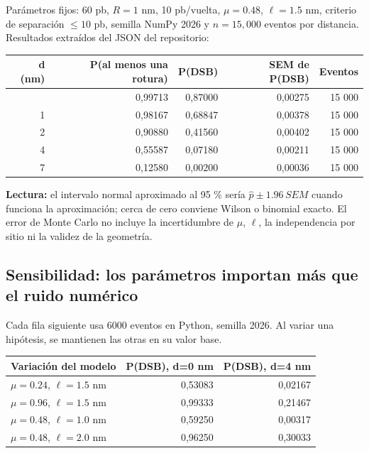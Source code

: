 \documentclass[11pt,a4paper,oneside]{article}
\begin{document}
Parámetros fijos: 60 pb, \(R=1\) nm, 10 pb/vuelta, \(\mu=0.48\), \(\ell=1.5\) nm, criterio de separación \(\leq10\) pb, semilla NumPy 2026 y \(n=15,000\) eventos por distancia. Resultados extraídos del JSON del repositorio:

\begin{longtable}[]{@{}rrrrr@{}}
\toprule\noalign{}
d (nm) & P(al menos una rotura) & P(DSB) & SEM de P(DSB) & Eventos \\
\midrule\noalign{}
\endhead
\bottomrule\noalign{}
\endlastfoot
0 & 0,99713 & 0,87000 & 0,00275 & 15 000 \\
1 & 0,98167 & 0,68847 & 0,00378 & 15 000 \\
2 & 0,90880 & 0,41560 & 0,00402 & 15 000 \\
4 & 0,55587 & 0,07180 & 0,00211 & 15 000 \\
7 & 0,12580 & 0,00200 & 0,00036 & 15 000 \\
\end{longtable}

\textbf{Lectura:} el intervalo normal aproximado al 95 \% sería \(\widehat p\pm1.96\,SEM\) cuando funciona la aproximación; cerca de cero conviene Wilson o binomial exacto. El error de Monte Carlo no incluye la incertidumbre de \(\mu\), \(\ell\), la independencia por sitio ni la validez de la geometría.

\subsection{Sensibilidad: los parámetros importan más que el ruido numérico}\label{sensibilidad-los-paruxe1metros-importan-muxe1s-que-el-ruido-numuxe9rico}

Cada fila siguiente usa 6000 eventos en Python, semilla 2026. Al variar una hipótesis, se mantienen las otras en su valor base.

\begin{longtable}[]{@{}lrr@{}}
\toprule\noalign{}
Variación del modelo & P(DSB), d=0 nm & P(DSB), d=4 nm \\
\midrule\noalign{}
\endhead
\bottomrule\noalign{}
\endlastfoot
\(\mu=0.24\), \(\ell=1.5\) nm & 0,53083 & 0,02167 \\
\(\mu=0.96\), \(\ell=1.5\) nm & 0,99333 & 0,21467 \\
\(\mu=0.48\), \(\ell=1.0\) nm & 0,59250 & 0,00317 \\
\(\mu=0.48\), \(\ell=2.0\) nm & 0,96250 & 0,30033 \\
\end{longtable}
\end{document}
